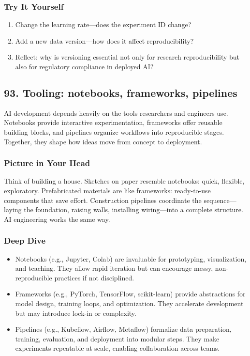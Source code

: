 \documentclass[
  letterpaper,
  DIV=11,
  numbers=noendperiod]{scrreprt}
\providecommand{\tightlist}{%
  \setlength{\itemsep}{0pt}\setlength{\parskip}{0pt}}
\begin{document}
\subsubsection{Try It Yourself}\label{try-it-yourself-91}

\begin{enumerate}
\def\labelenumi{\arabic{enumi}.}
\tightlist
\item
  Change the learning rate---does the experiment ID change?
\item
  Add a new data version---how does it affect reproducibility?
\item
  Reflect: why is versioning essential not only for research
  reproducibility but also for regulatory compliance in deployed AI?
\end{enumerate}

\subsection{93. Tooling: notebooks, frameworks,
pipelines}\label{tooling-notebooks-frameworks-pipelines}

AI development depends heavily on the tools researchers and engineers
use. Notebooks provide interactive experimentation, frameworks offer
reusable building blocks, and pipelines organize workflows into
reproducible stages. Together, they shape how ideas move from concept to
deployment.

\subsubsection{Picture in Your Head}\label{picture-in-your-head-92}

Think of building a house. Sketches on paper resemble notebooks: quick,
flexible, exploratory. Prefabricated materials are like frameworks:
ready-to-use components that save effort. Construction pipelines
coordinate the sequence---laying the foundation, raising walls,
installing wiring---into a complete structure. AI engineering works the
same way.

\subsubsection{Deep Dive}\label{deep-dive-92}

\begin{itemize}
\tightlist
\item
  Notebooks (e.g., Jupyter, Colab) are invaluable for prototyping,
  visualization, and teaching. They allow rapid iteration but can
  encourage messy, non-reproducible practices if not disciplined.
\item
  Frameworks (e.g., PyTorch, TensorFlow, scikit-learn) provide
  abstractions for model design, training loops, and optimization. They
  accelerate development but may introduce lock-in or complexity.
\item
  Pipelines (e.g., Kubeflow, Airflow, Metaflow) formalize data
  preparation, training, evaluation, and deployment into modular steps.
  They make experiments repeatable at scale, enabling collaboration
  across teams.
\end{itemize}
\end{document}
